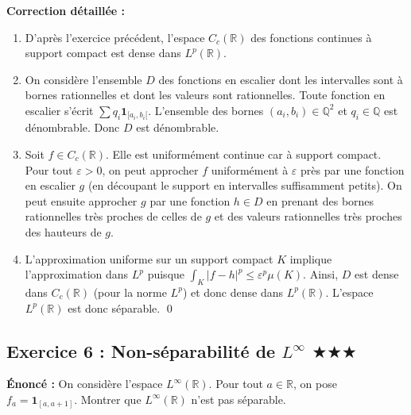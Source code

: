 \documentclass[11pt,a4paper]{article}
\begin{document}
\textbf{Correction détaillée :}
\begin{enumerate}
\item D'après l'exercice précédent, l'espace $C_c(\mathbb{R})$ des fonctions continues à support compact est dense dans $L^p(\mathbb{R})$.
\item On considère l'ensemble $D$ des fonctions en escalier dont les intervalles sont à bornes rationnelles et dont les valeurs sont rationnelles.
   Toute fonction en escalier s'écrit $\sum q_i \mathbf{1}_{[a_i, b_i[}$. L'ensemble des bornes $(a_i, b_i) \in \mathbb{Q}^2$ et $q_i \in \mathbb{Q}$ est dénombrable. Donc $D$ est dénombrable.
\item Soit $f \in C_c(\mathbb{R})$. Elle est uniformément continue car à support compact. Pour tout $\varepsilon > 0$, on peut approcher $f$ uniformément à $\varepsilon$ près par une fonction en escalier $g$ (en découpant le support en intervalles suffisamment petits).
   On peut ensuite approcher $g$ par une fonction $h \in D$ en prenant des bornes rationnelles très proches de celles de $g$ et des valeurs rationnelles très proches des hauteurs de $g$.
\item L'approximation uniforme sur un support compact $K$ implique l'approximation dans $L^p$ puisque $\int_K |f-h|^p \le \varepsilon^p \mu(K)$.
   Ainsi, $D$ est dense dans $C_c(\mathbb{R})$ (pour la norme $L^p$) et donc dense dans $L^p(\mathbb{R})$.
   L'espace $L^p(\mathbb{R})$ est donc séparable. \qed
\end{enumerate}


\subsection*{Exercice 6 : Non-séparabilité de $L^\infty$ \quad $\bigstar\bigstar\bigstar$}
\textbf{Énoncé :}
On considère l'espace $L^\infty(\mathbb{R})$.
Pour tout $a \in \mathbb{R}$, on pose $f_a = \mathbf{1}_{[a, a+1]}$.
Montrer que $L^\infty(\mathbb{R})$ n'est pas séparable.
\end{document}
